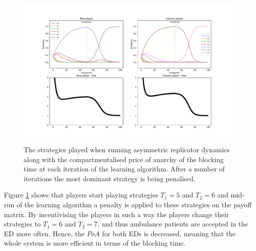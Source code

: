 \begin{figure}[H]
    \includegraphics[width=\textwidth]{imgs/asymmetric_rd_and_PoA/asymmetric_penalty.pdf}
    \caption{
        The strategies played when running asymmetric replicator dynamics
        along with the compartmentalised price of anarchy of the blocking time 
        at each iteration of the learning algorithm. After a number of 
        iterations the most dominant strategy is being penalised.
    }
    \label{fig:ard_penalty}
\end{figure}

Figure \ref{fig:ard_penalty} shows that players start playing strategies 
\( T_1 = 5\) and \( T_2 = 6 \) and mid-run of the learning algorithm a penalty
is applied to these strategies on the payoff matrix.
By incentivising the players in such a way the players change their strategies 
to \(T_1 = 6\) and \(T_2 = 7\), and thus ambulance patients are accepted in the 
ED more often.
Hence, the \(PoA\) for both EDs is decreased, meaning that the whole system is
more efficient in terms of the blocking time.
